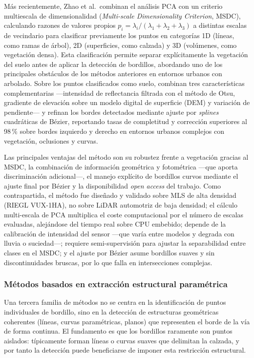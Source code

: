 Más recientemente, Zhao et al.\ combinan el análisis PCA con un
criterio multiescala de dimensionalidad (\textit{Multi-scale
Dimensionality Criterion}, MSDC), calculando razones de valores propios
$p_i = \lambda_i / (\lambda_1 + \lambda_2 + \lambda_3)$ a distintas
escalas de vecindario para clasificar previamente los puntos en
categorías 1D (líneas, como ramas de árbol), 2D (superficies, como
calzada) y 3D (volúmenes, como vegetación densa). Esta clasificación
permite separar explícitamente la vegetación del suelo antes de aplicar
la detección de bordillos, abordando uno de los principales obstáculos
de los métodos anteriores en entornos urbanos con arbolado. Sobre los
puntos clasificados como suelo, combinan tres características
complementarias ---intensidad de reflectancia filtrada con el método de
Otsu, gradiente de elevación sobre un modelo digital de superficie
(DEM) y variación de pendiente--- y refinan los bordes detectados
mediante ajuste por \textit{splines} cuadráticas de Bézier, reportando
tasas de completitud y corrección superiores al 98\,\% sobre bordes
izquierdo y derecho en entornos urbanos complejos con vegetación,
oclusiones y curvas.

Las principales ventajas del método son su robustez frente a vegetación
gracias al MSDC, la combinación de información geométrica y fotométrica
---que aporta discriminación adicional---, el manejo explícito de
bordillos curvos mediante el ajuste final por Bézier y la
disponibilidad \textit{open access} del trabajo. Como contrapartida, el
método fue diseñado y validado sobre MLS de alta densidad (RIEGL
VUX-1HA), no sobre LiDAR automotriz de baja densidad; el cálculo
multi-escala de PCA multiplica el coste computacional por el número de
escalas evaluadas, alejándose del tiempo real sobre CPU embebido;
depende de la calibración de intensidad del sensor ---que varía entre
modelos y degrada con lluvia o suciedad---; requiere semi-supervisión
para ajustar la separabilidad entre clases en el MSDC; y el ajuste por
Bézier asume bordillos suaves y sin discontinuidades bruscas, por lo
que falla en intersecciones complejas.

\subsubsection{Métodos basados en extracción estructural paramétrica}
\label{sec:curbs-estructural}

Una tercera familia de métodos no se centra en la identificación de
puntos individuales de bordillo, sino en la detección de estructuras
geométricas coherentes (líneas, curvas paramétricas, planos) que
representen el borde de la vía de forma continua. El fundamento es que
los bordillos raramente son puntos aislados: típicamente forman líneas
o curvas suaves que delimitan la calzada, y por tanto la detección
puede beneficiarse de imponer esta restricción estructural.

